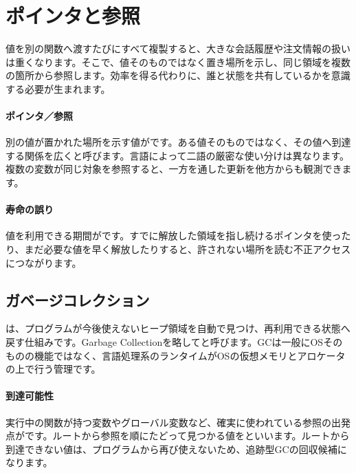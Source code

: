 \section{ポインタと参照}
\label{sec:03-runtime-data-06}

値を別の関数へ渡すたびにすべて複製すると、大きな会話履歴や注文情報の扱いは重くなります。そこで、値そのものではなく置き場所を示し、同じ領域を複数の箇所から参照します。効率を得る代わりに、誰と状態を共有しているかを意識する必要が生まれます。

\begingroup
\begingroup
\paragraph{ポインタ／参照}
        別の値が置かれた場所を示す値がです。ある値そのものではなく、その値へ到達する関係を広くと呼びます。言語によって二語の厳密な使い分けは異なります。複数の変数が同じ対象を参照すると、一方を通した更新を他方からも観測できます。

\par
\endgroup
\medskip
\begingroup
\paragraph{寿命の誤り}
        値を利用できる期間がです。すでに解放した領域を指し続けるポインタを使ったり、まだ必要な値を早く解放したりすると、許されない場所を読む不正アクセスにつながります。

\par
\endgroup
\medskip
\subsection{ガベージコレクション}

は、プログラムが今後使えないヒープ領域を自動で見つけ、再利用できる状態へ戻す仕組みです。Garbage Collectionを略してと呼びます。GCは一般にOSそのものの機能ではなく、言語処理系のランタイムがOSの仮想メモリとアロケータの上で行う管理です。

\paragraph{到達可能性}
実行中の関数が持つ変数やグローバル変数など、確実に使われている参照の出発点がです。ルートから参照を順にたどって見つかる値をといいます。ルートから到達できない値は、プログラムから再び使えないため、追跡型GCの回収候補になります。

